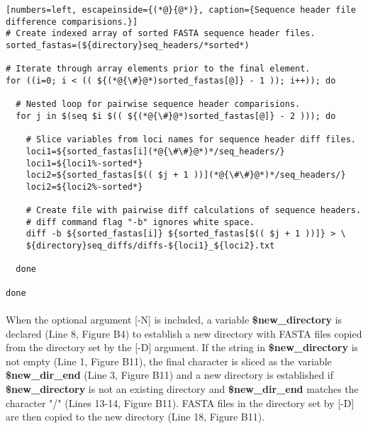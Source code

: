 \begin{lstlisting}[numbers=left, escapeinside={(*@}{@*)}, caption={Sequence header file difference comparisions.}]
# Create indexed array of sorted FASTA sequence header files.
sorted_fastas=(${directory}seq_headers/*sorted*)

# Iterate through array elements prior to the final element.
for ((i=0; i < (( ${(*@{\#}@*)sorted_fastas[@]} - 1 )); i++)); do 

  # Nested loop for pairwise sequence header comparisions.
  for j in $(seq $i $(( ${(*@{\#}@*)sorted_fastas[@]} - 2 ))); do
  
    # Slice variables from loci names for sequence header diff files.
    loci1=${sorted_fastas[i](*@{\#\#}@*)*/seq_headers/}
    loci1=${loci1%-sorted*}
    loci2=${sorted_fastas[$(( $j + 1 ))](*@{\#\#}@*)*/seq_headers/}
    loci2=${loci2%-sorted*}

    # Create file with pairwise diff calculations of sequence headers.
    # diff command flag "-b" ignores white space.
    diff -b ${sorted_fastas[i]} ${sorted_fastas[$(( $j + 1 ))]} > \
    ${directory}seq_diffs/diffs-${loci1}_${loci2}.txt
  
  done
  
done
\end{lstlisting}

\vspace*{36pt}

\paragraph{} When the optional argument [-N] is included, a variable \textbf{\$new\_directory} is declared (Line 8, Figure B4) to establish a new directory with FASTA files copied from the directory set by the [-D] argument.  If the string in \textbf{\$new\_directory} is not empty (Line 1, Figure B11), the final character is sliced as the variable \textbf{\$new\_dir\_end} (Line 3, Figure B11) and a new directory is established if \textbf{\$new\_directory} is not an existing directory and \textbf{\$new\_dir\_end} matches the character "/" (Lines 13-14, Figure B11).  FASTA files in the directory set by [-D] are then copied to the new directory (Line 18, Figure B11).  

\vspace*{36pt}

